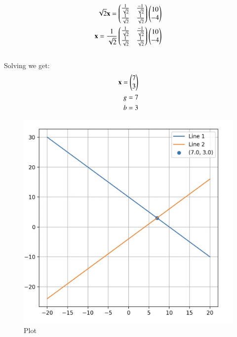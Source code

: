 \documentclass[12pt]{article}
\begin{document}
\begin{align}
\sqrt{2}\mathbf{x} = \begin{pmatrix}\frac{1}{\sqrt{2}} & \frac{-1}{\sqrt{2}} \\  \frac{1}{\sqrt{2}}& \frac{1}{\sqrt{2}}\end{pmatrix} \begin{pmatrix}10\\-4\end{pmatrix}\\
\mathbf{x} = \frac{1}{\sqrt{2}}\begin{pmatrix}\frac{1}{\sqrt{2}} & \frac{-1}{\sqrt{2}} \\  \frac{1}{\sqrt{2}}& \frac{1}{\sqrt{2}}\end{pmatrix} \begin{pmatrix}10\\-4\end{pmatrix}
\end{align}\\
Solving we get:\begin{align}
\mathbf{x} = \begin{pmatrix}7\\3\end{pmatrix} \\
g = 7\\
b=3
\end{align}

\begin{figure}[H]
    \centering
    \includegraphics[width=0.6\columnwidth]{Figs/582.png}
    \caption{Plot}
    \label{fig:placeholder}
\end{figure}
\end{document}
